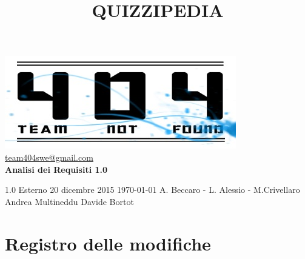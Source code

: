 \documentclass[a4paper,11pt]{article}
\title{\textbf{{\fontsize{8mm}{5mm}\selectfont QUIZZIPEDIA}}}
\date{}
\author{}
\begin{document}
	\maketitle
	\thispagestyle{empty}
	\begin{center}
	\includegraphics{../../team_not_found.jpg}\\
	\fontsize{5mm}{3mm}\url{team404swe@gmail.com}\\
	
	\vspace{50mm}
	\textbf{Analisi dei Requisiti 1.0}
	\end{center}
	
			{1.0} 							%
			{Esterno} 						%
			{20 dicembre 2015} 				%
			{\today} 						%
			{A. Beccaro - L. Alessio - M.Crivellaro}	%
			{Andrea Multineddu} 				%
			{Davide Bortot} 		%
	\newpage
	\thispagestyle{empty}
	\null
	\newpage
		
	\hspace{30 mm}
	\fancyfoot[R]{\thepage}
	\section*{Registro delle modifiche}
	
\end{document}
